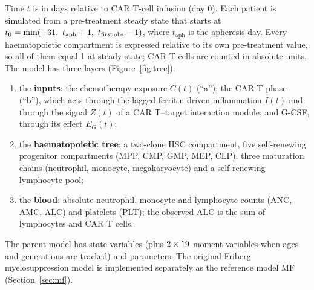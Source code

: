 \documentclass[11pt]{article}
\begin{document}
Time $t$ is in days relative to CAR T-cell infusion (day 0). Each patient is simulated from a pre-treatment steady state that starts at $t_0=\min(\valTmin,\ t_{\mathrm{aph}}+1,\ t_{\mathrm{first\,obs}}-1)$, where $t_{\mathrm{aph}}$ is the apheresis day. Every haematopoietic compartment is expressed relative to its own pre-treatment value, so all of them equal 1 at steady state; CAR T cells are counted in absolute units. The model has three layers (Figure~\ref{fig:tree}):
\begin{enumerate}
\item the \textbf{inputs}: the chemotherapy exposure $C(t)$ (``a''); the CAR T phase (``b''), which acts through the lagged ferritin-driven inflammation $I(t)$ and through the signal $Z(t)$ of a CAR T--target interaction module; and G-CSF, through its effect $E_G(t)$;
\item the \textbf{haematopoietic tree}: a two-clone HSC compartment, five self-renewing progenitor compartments (MPP, CMP, GMP, MEP, CLP), three maturation chains (neutrophil, monocyte, megakaryocyte) and a self-renewing lymphocyte pool;
\item the \textbf{blood}: absolute neutrophil, monocyte and lymphocyte counts (ANC, AMC, ALC) and platelets (PLT); the observed ALC is the sum of lymphocytes and CAR T cells.
\end{enumerate}
The parent model has \valNStates{} state variables (plus $2\times19$ moment variables when ages and generations are tracked) and \valNPar{} parameters. The original Friberg myelosuppression model \citep{friberg2002} is implemented separately as the reference model MF (Section~\ref{sec:mf}).
\end{document}
